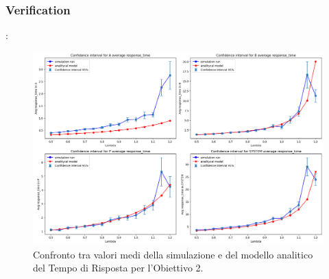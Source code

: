 \subsubsection{Verification}
\begin{frame}{\subsecname: \subsubsecname}
\begin{figure}
    \centering
    \includegraphics[width=0.75\linewidth]{figs/results/obj2/verification/obj2_lineplots_rtime.png}
    \caption{ Confronto tra valori medi della simulazione e del modello analitico del Tempo di Risposta per l’Obiettivo 2.}
    \label{fig:enter-label}
\end{figure}   
\end{frame}

